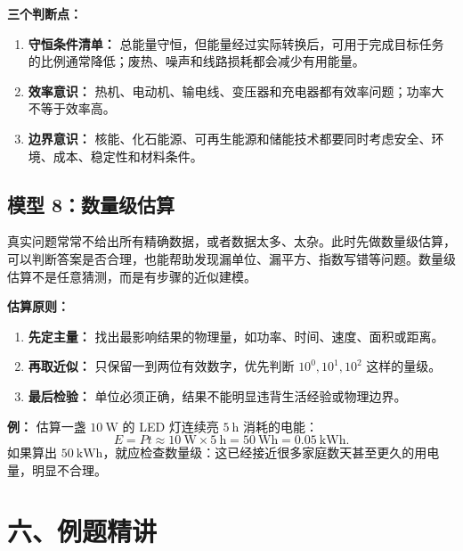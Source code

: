 \textbf{三个判断点：}
\begin{enumerate}
  \item \textbf{守恒条件清单：} 总能量守恒，但能量经过实际转换后，可用于完成目标任务的比例通常降低；废热、噪声和线路损耗都会减少有用能量。
  \item \textbf{效率意识：} 热机、电动机、输电线、变压器和充电器都有效率问题；功率大不等于效率高。
  \item \textbf{边界意识：} 核能、化石能源、可再生能源和储能技术都要同时考虑安全、环境、成本、稳定性和材料条件。
\end{enumerate}

\subsection*{模型 8：数量级估算}

真实问题常常不给出所有精确数据，或者数据太多、太杂。此时先做数量级估算，可以判断答案是否合理，也能帮助发现漏单位、漏平方、指数写错等问题。数量级估算不是任意猜测，而是有步骤的近似建模。

\begin{center}


\label{fig:order-of-magnitude-estimate}
\end{center}

\textbf{估算原则：}
\begin{enumerate}
  \item \textbf{先定主量：} 找出最影响结果的物理量，如功率、时间、速度、面积或距离。
  \item \textbf{再取近似：} 只保留一到两位有效数字，优先判断 $10^0,10^1,10^2$ 这样的量级。
  \item \textbf{最后检验：} 单位必须正确，结果不能明显违背生活经验或物理边界。
\end{enumerate}

\textbf{例：} 估算一盏 $10\ \mathrm{W}$ 的 LED 灯连续亮 $5\ \mathrm{h}$ 消耗的电能：
\[
E=Pt\approx 10\ \mathrm{W}\times 5\ \mathrm{h}=50\ \mathrm{Wh}=0.05\ \mathrm{kWh}.
\]
如果算出 $50\ \mathrm{kWh}$，就应检查数量级：这已经接近很多家庭数天甚至更久的用电量，明显不合理。

\newpage
\section*{六、例题精讲}

